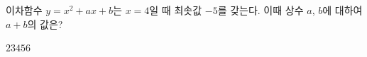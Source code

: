 \hspace*{2mm}\begin{minipage}[t]{\dimexpr\linewidth-2mm\relax}\vspace{0pt}
이차함수 $y=x^2+ax+b$는 $x=4$일 때 최솟값 $-5$를 갖는다. 이때 상수 $a$, $b$에 대하여 $a+b$의 값은?
\begin{choices32}{$2$}{$3$}{$4$}{$5$}{$6$}\end{choices32}\end{minipage}
